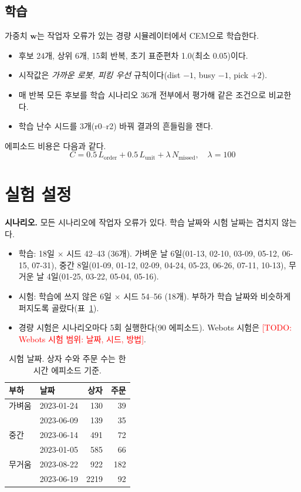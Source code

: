 \documentclass[conference]{IEEEtran}
\newcommand{\todo}[1]{\textcolor{red}{[TODO: #1]}}
\begin{document}
\subsection{학습}
가중치 $\mathbf{w}$는 작업자 오류가 있는 경량 시뮬레이터에서 CEM으로 학습한다.
\begin{itemize}
  \item 후보 24개, 상위 6개, 15회 반복, 초기 표준편차 1.0(최소 0.05)이다.
  \item 시작값은 \emph{가까운 로봇, 피킹 우선} 규칙이다(dist $-1$, busy $-1$, pick $+2$).
  \item 매 반복 모든 후보를 학습 시나리오 36개 전부에서 평가해 같은 조건으로 비교한다.
  \item 학습 난수 시드를 3개(r0--r2) 바꿔 결과의 흔들림을 잰다.
\end{itemize}
에피소드 비용은 다음과 같다.
\begin{equation}
  C = 0.5\,L_{\text{order}} + 0.5\,L_{\text{unit}} + \lambda\,N_{\text{missed}}, \quad \lambda = 100
\end{equation}

\section{실험 설정}

\textbf{시나리오.} 모든 시나리오에 작업자 오류가 있다. 학습 날짜와 시험 날짜는 겹치지 않는다.
\begin{itemize}
  \item 학습: 18일 $\times$ 시드 42--43 (36개). 가벼운 날 6일(01-13, 02-10, 03-09, 05-12, 06-15, 07-31), 중간 8일(01-09, 01-12, 02-09, 04-24, 05-23, 06-26, 07-11, 10-13), 무거운 날 4일(01-25, 03-22, 05-04, 05-16). %
  \item 시험: 학습에 쓰지 않은 6일 $\times$ 시드 54--56 (18개). 부하가 학습 날짜와 비슷하게 퍼지도록 골랐다(표~\ref{tab:testdays}). %
  \item 경량 시험은 시나리오마다 5회 실행한다(90 에피소드). Webots 시험은 \todo{Webots 시험 범위: 날짜, 시드, 방법}.
\end{itemize}

\begin{table}[t]
\centering
\caption{시험 날짜. 상자 수와 주문 수는 한 시간 에피소드 기준.} %
\label{tab:testdays}
\small
\begin{tabular}{llrr}
\toprule
부하 & 날짜 & 상자 & 주문 \\
\midrule
가벼움 & 2023-01-24 & 130 & 39 \\
 & 2023-06-09 & 139 & 35 \\
중간 & 2023-06-14 & 491 & 72 \\
 & 2023-01-05 & 585 & 66 \\
무거움 & 2023-08-22 & 922 & 182 \\
 & 2023-06-19 & 2219 & 92 \\
\bottomrule
\end{tabular}
\end{table}
\end{document}
